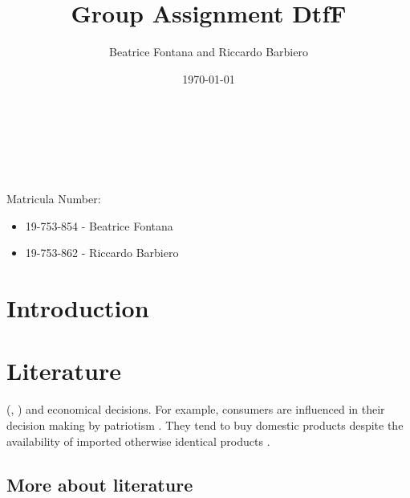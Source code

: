 \documentclass[a4paper, 12pt, english]{article}
\begin{document}
		
\title{Group Assignment DtfF}		
\author{Beatrice Fontana and Riccardo Barbiero}

\date{\today}
\maketitle
Matricula Number:
    \begin{itemize}
        \item 19-753-854 - Beatrice Fontana
        \item 19-753-862 - Riccardo Barbiero 
    \end{itemize}  
    
\begin{abstract}
\blindtext[1]
\\
\\
\\
\end{abstract}

\newpage
{}


\tableofcontents

\clearpage

\section{Introduction}
\blindtext[1]



\clearpage
\section{Literature}
\blindtext[1] (\cite{clift2012economic}, \cite{morgan2012supporting}) and economical decisions.
For example, consumers are influenced in their decision making by patriotism \citep{spielmann2018product}. 
They tend to buy domestic products despite the availability of imported otherwise identical products \citep{shankarmahesh2006consumer}.\\


\subsection{More about literature}
\end{document}
